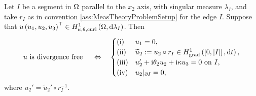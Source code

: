 \begin{prop} \label{prop:DivFreeSegment}
	Let $I$ be a segment in $\Omega$ parallel to the $x_2$ axis, with singular measure $\lambda_I$, and take $r_I$ as in convention \ref{ass:MeasTheoryProblemSetup} for the edge $I$.
	Suppose that $u\left( u_1, u_2, u_3 \right)^\top\in H^1_{\kappa,\theta,\mathrm{curl}}\left( \Omega, \mathrm{d}\lambda_I \right)$.
	Then
	\begin{align*}
		u \text{ is divergence free } \quad\Leftrightarrow\quad 
		\begin{cases}
			\mathrm{(i)} & u_1 = 0, \\
			\mathrm{(ii)} & \widetilde{u}_2 := u_2 \circ r_I \in H^1_\mathrm{grad}\left( \left[ 0,\left\lvert I \right\rvert \right], \mathrm{d}t \right), \\
			\mathrm{(iii)} & u_2' + \mathrm{i}\theta_2 u_2 + \mathrm{i}\kappa u_3 = 0 \text{ on } I, \\
			\mathrm{(iv)} & u_2\vert_{\partial I} = 0,
		\end{cases}
	\end{align*}
	where $u_2' = \widetilde{u}_2'\circ r_I^{-1}$.
\end{prop}
